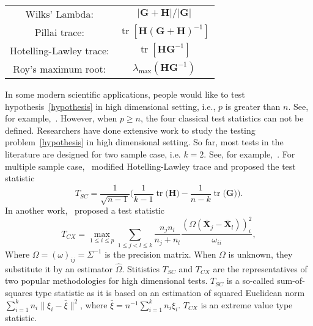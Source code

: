 \documentclass[12pt]{article} %
\DeclareMathOperator{\mytr}{tr}
\newcommand{\bX}{\mathbf{X}}
\newcommand{\bH}{\mathbf{H}}
\newcommand{\bG}{\mathbf{G}}
\theoremstyle{definition}
\begin{document}
       \begin{center}
       \begin{tabular}{|cc|}
           \hline
       {Wilks' Lambda:} & $|\bG+\bH|/|\bG|$\\
       {Pillai trace:} & $\mytr[\bH(\bG+\bH)^{-1}]$\\
       {Hotelling-Lawley trace:} & $\mytr[\bH \bG^{-1}]$\\
       {Roy's maximum root:} & $\lambda_{\max}(\bH \bG^{-1})$\\
           \hline
           \end{tabular}
       \end{center}



In some modern scientific applications, people would like to test hypothesis~\eqref{hypothesis} in high dimensional setting, i.e., $p$ is greater than $n$.
See, for example,~\cite{Tsai2009}.
However, when $p\geq n$, the four classical test statistics can not be defined.
  Researchers have done extensive work to study the testing problem~\eqref{hypothesis} in high dimensional setting.
 So far, most tests in the literature are designed for two sample case, i.e. $k=2$.
  See, for example,~\citet{Bai1996Efiect,Chen2010A,Srivastava2009A,Tony2013,Feng2015Multivariate}.
  For multiple sample case,~\cite{Schott2007Some} modified Hotelling-Lawley trace and proposed the test statistic
  $$
  T_{SC}=\frac{1}{\sqrt{n-1}}\Big(
  \frac{1}{k-1}\mytr\big(\bH\big)-\frac{1}{n-k}\mytr\big(\bG\big)
  \Big).
  $$
In another work,~\cite{Cai2014High} proposed a test statistic
  $$
  T_{CX}=\max_{1\leq i\leq p} \sum_{1\leq j<l\leq k}\frac{n_j n_l}{n_j+n_l}\frac{(\Omega(\bar{\bX}_j-\bar{\bX}_l))_i^2}{\omega_{ii}},
  $$
  Where $\Omega=(\omega)_{ij}=\Sigma^{-1}$ is the precision matrix. When $\Omega$ is unknown, they substitute it by an estimator $\hat{\Omega}$.
  Stitistics $T_{SC}$ and $T_{CX}$ are the representatives of two popular methodologies for high dimensional tests.
  $T_{SC}$ is a so-called sum-of-squares type statistic as it is based on an estimation of squared Euclidean norm $\sum_{i=1}^k n_i\|\xi_i-\bar{\xi}\|^2$, where $\bar{\xi}=n^{-1}\sum_{i=1}^k n_i \xi_i$.
  $T_{CX}$ is an extreme value type statistic.
  
\end{document}
